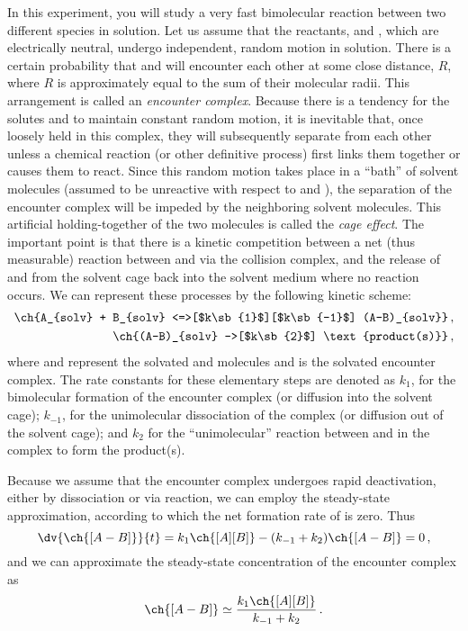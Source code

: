 In this experiment, you will study a very fast bimolecular reaction between two different species in solution. 
Let us assume that the reactants,  and , which are electrically neutral, undergo independent, random motion in solution. 
There is a certain probability that  and  will encounter each other at some close distance, \(R\), where \(R\) is approximately equal to the sum of their molecular radii. 
This arrangement is called an \emph{encounter complex}. 
Because there is a tendency for the solutes  and  to maintain constant random motion, it is inevitable that, once
loosely held in this complex, they will subsequently separate from each other unless a chemical
reaction (or other definitive process) first links them together or causes them to react. 
Since this random motion takes place in a ``bath'' of solvent molecules (assumed to be unreactive with respect
to  and ), the separation of the  encounter complex will be impeded by the neighboring
solvent molecules. 
This artificial holding-together of the two molecules is called the \emph{cage effect}.
The important point is that there is a kinetic competition between a net (thus measurable) reaction
between  and  via the collision complex, and the release of  and  from the solvent cage back
into the solvent medium where no reaction occurs. 
We can represent these processes by the following kinetic scheme:
\begin{align}
\begin{split}
	\ch{A_{solv} + B_{solv} <=>[$k\sb{1}$][$k\sb{-1}$] (A-B)_{solv}} \, , \\
	\ch{(A-B)_{solv} ->[$k\sb{2}$] \text{product(s)}} \, ,
\end{split}
\label{eq:rxn_scheme}
\end{align}
where  and  represent the solvated  and  molecules and  is the solvated encounter complex. 
The rate constants for these elementary steps are denoted as \( k_1 \), for the bimolecular formation of the encounter complex (or diffusion into the solvent cage); \( k_{-1} \), for the unimolecular dissociation of the complex (or diffusion out of the solvent cage); and \( k_2 \) for the ``unimolecular'' reaction between  and  in the complex to form the product(s). 

Because we assume that the encounter complex undergoes rapid deactivation, either by
dissociation or via reaction, we can employ the steady-state approximation, according to which
the net formation rate of  is zero. Thus
\[
	\dv{\ch{[A-B]}}{t} = k_1 \ch{[A][B]} - (k_{-1} + k_2)\ch{[A-B]} = 0 \, ,
\]
and we can approximate the steady-state concentration of the encounter complex as 
\[
	\ch{[A-B]} \simeq \frac{k_1\ch{[A][B]}}{k_{-1}+k_2} \, .
\]

